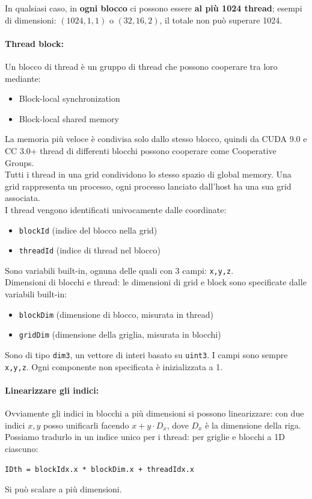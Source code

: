 In qualsiasi caso, in \textbf{ogni blocco} ci possono essere \textbf{al più 1024 thread}; esempi di dimensioni: $(1024, 1, 1)$  o $(32, 16, 2)$, il totale non può superare 1024.\\

\paragraph{Thread block:} Un blocco di thread è un gruppo di thread che possono cooperare tra loro mediante:
\begin{itemize}
	\item Block-local synchronization
	\item Block-local shared memory
\end{itemize}

La memoria più veloce è condivisa solo dallo stesso blocco, quindi da CUDA 9.0 e CC 3.0+ thread di differenti blocchi possono cooperare come Cooperative Groups.\\

Tutti i thread in una grid condividono lo stesso spazio di global memory. Una grid rappresenta un processo, ogni processo lanciato dall'host ha una sua grid associata.\\

I thread vengono identificati univocamente dalle coordinate: 
\begin{itemize}
	\item \texttt{blockId} (indice del blocco nella grid)
	\item \texttt{threadId} (indice di thread nel blocco)
\end{itemize}
Sono variabili built-in, ognuna delle quali con 3 campi: \texttt{x,y,z}.\\

Dimensioni di blocchi e thread: le dimensioni di grid e block sono specificate dalle variabili built-in: 
\begin{itemize}
	\item \texttt{blockDim} (dimensione di blocco, misurata in thread)
	\item \texttt{gridDim} (dimensione della griglia, misurata in blocchi)
\end{itemize}
Sono di tipo \texttt{dim3}, un vettore di interi basato su \texttt{uint3}. I campi sono sempre \texttt{x,y,z}. Ogni componente non specificata è inizializzata a 1.\\

\paragraph{Linearizzare gli indici:} Ovviamente gli indici in blocchi a più dimensioni si possono linearizzare: con due indici $x,y$ posso unificarli facendo $x + y \cdot D_x$, dove $D_x$ è la dimensione della riga.\\
Possiamo tradurlo in un indice unico per i thread: per griglie e blocchi a 1D ciascuno: 
\begin{center}
	\texttt{IDth = blockIdx.x * blockDim.x + threadIdx.x}
\end{center}
Si può scalare a più dimensioni.\\

